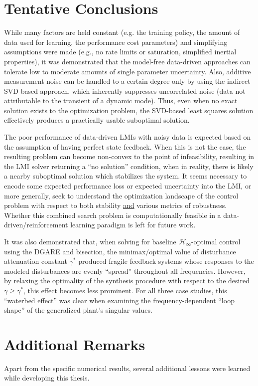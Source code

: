 \section{Tentative Conclusions}
While many factors are held constant (e.g. the training policy, the amount of data used for learning, the performance cost parameters) and simplifying assumptions were made (e.g., no rate limits or saturation, simplified inertial properties), it was demonstrated that the model-free data-driven approaches can tolerate low to moderate amounts of single parameter uncertainty.  Also, additive measurement noise can be handled to a certain degree only by using the indirect SVD-based approach, which inherently suppresses uncorrelated noise (data not attributable to the transient of a dynamic mode).  Thus, even when no exact solution exists to the optimization problem, the SVD-based least squares solution effectively produces a practically usable suboptimal solution.

The poor performance of data-driven LMIs with noisy data is expected based on the assumption of having perfect state feedback.  When this is not the case, the resulting problem can become non-convex to the point of infeasibility, resulting in the LMI solver returning a ``no solution'' condition, when in reality, there is likely a nearby suboptimal solution which stabilizes the system.  It seems necessary to encode some expected performance loss or expected uncertainty into the LMI, or more generally, seek to understand the optimization landscape of the control problem with respect to both stability \underline{and} various metrics of robustness.  Whether this combined search problem is computationally feasible in a data-driven/reinforcement learning paradigm is left for future work.

It was also demonstrated that, when solving for baseline $\mathcal{H}_{\infty}$-optimal control using the DGARE and bisection, the minimax/optimal value of disturbance attenuation constant $\gamma^{*}$ produced fragile feedback systems whose responses to the modeled disturbances are evenly ``spread'' throughout all frequencies.  However, by relaxing the optimality of the synthesis procedure with respect to the desired $\gamma \geq \gamma^{*}$, this effect becomes less prominent.  For all three case studies, this ``waterbed effect'' was clear when examining the frequency-dependent ``loop shape'' of the generalized plant's singular values.

\section{Additional Remarks}
Apart from the specific numerical results, several additional lessons were learned while developing this thesis.

